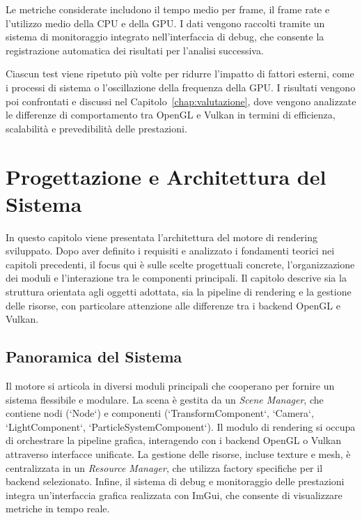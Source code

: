 \documentclass[12pt,a4paper,openright,twoside]{book}
\begin{document}
Le metriche considerate includono il tempo medio per frame, il frame rate e l'utilizzo medio della CPU e della GPU.
I dati vengono raccolti tramite un sistema di monitoraggio integrato nell'interfaccia di debug, che consente la
registrazione automatica dei risultati per l'analisi successiva.

Ciascun test viene ripetuto più volte per ridurre l'impatto di fattori esterni, come i processi di sistema o
l'oscillazione della frequenza della GPU. I risultati vengono poi confrontati e discussi nel
Capitolo~\ref{chap:valutazione}, dove vengono analizzate le differenze di comportamento tra OpenGL e Vulkan in termini
di efficienza, scalabilità e prevedibilità delle prestazioni.

\chapter{Progettazione e Architettura del Sistema}
\label{chap:design}
\noindent
In questo capitolo viene presentata l'architettura del motore di rendering sviluppato. Dopo aver definito i requisiti
e analizzato i fondamenti teorici nei capitoli precedenti, il focus qui è sulle scelte progettuali concrete,
l'organizzazione dei moduli e l'interazione tra le componenti principali. Il capitolo descrive sia la struttura
orientata agli oggetti adottata, sia la pipeline di rendering e la gestione delle risorse, con particolare attenzione
alle differenze tra i backend OpenGL e Vulkan.

\section{Panoramica del Sistema}
Il motore si articola in diversi moduli principali che cooperano per fornire un sistema flessibile e modulare.
La scena è gestita da un \emph{Scene Manager}, che contiene nodi (`Node`) e componenti (`TransformComponent`, `Camera`,
`LightComponent`, `ParticleSystemComponent`). Il modulo di rendering si occupa di orchestrare la pipeline grafica,
interagendo con i backend OpenGL o Vulkan attraverso interfacce unificate. La gestione delle risorse, incluse texture e
mesh, è centralizzata in un \emph{Resource Manager}, che utilizza factory specifiche per il backend selezionato.
Infine, il sistema di debug e monitoraggio delle prestazioni integra un'interfaccia grafica realizzata con ImGui,
che consente di visualizzare metriche in tempo reale.
\end{document}

